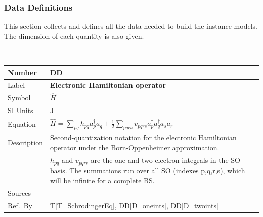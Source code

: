 \documentclass[12pt]{article}
\newcommand{\colAwidth}{0.13\textwidth}
\newcommand{\colBwidth}{0.82\textwidth}
\newcounter{defnum} %
\newcounter{datadefnum} %
\newcommand{\ddref}[1]{DD\ref{#1}}
\newcommand{\tref}[1]{T\ref{#1}}
\begin{document}
\subsubsection{Data Definitions}\label{sec_datadef}

This section collects and defines all the data needed to build the instance
models. The dimension of each quantity is also given.  

~\newline

\noindent
\begin{minipage}{\textwidth}
	\renewcommand*{\arraystretch}{1.5}
	\begin{tabular}{| p{\colAwidth} | p{\colBwidth}|}
		\hline
		\rowcolor[gray]{0.9}
		Number& DD{datadefnum}\thedatadefnum 
		\label{D_hamiltonian}\\
		\hline
		Label& \bf Electronic Hamiltonian operator\\
		\hline
		Symbol & $\hat{H}$\\
		\hline
		SI Units & \si{\joule}\\
		\hline
		Equation&$\hat{H} = \sum_{pq} h_{pq} a^{\dagger}_p a_q + \frac{1}{2} 
		\sum_{pqrs} v_{pqrs} a^{\dagger}_p a^{\dagger}_q a_s a_r$\\
		\hline
		Description & Second-quantization notation for the electronic 
		Hamiltonian operator under the Born-Oppenheimer approximation.
		\\
		&$h_{pq} $ and $ v_{pqrs}$ are the one and two electron integrals in 
		the SO basis. The summations run over all SO 
		(indexes p,q,r,s), which will be infinite for a complete BS.\\
		\hline
		Sources& \cite{szabo-ostlund} \\
		\hline
		Ref.\ By & \tref{T_SchrodingerEq}, \ddref{D_oneints}, 
		\ddref{D_twoints}\\
		\hline
	\end{tabular}
\end{minipage}\\

~\newline
\end{document}

